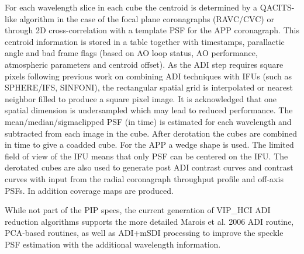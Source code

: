 For each wavelength slice in each cube the centroid is determined by a QACITS-like algorithm in the case of the focal plane coronagraphs (RAVC/CVC) or through 2D cross-correlation with a template PSF for the APP coronagraph. This centroid information is stored in a table together with timestamps, parallactic angle and bad frame flags (based on AO loop status, AO performance, atmospheric parameters and centroid offset).
As the ADI step requires square pixels following previous work on combining ADI techniques with IFUs (such as SPHERE/IFS, SINFONI), the rectangular spatial grid is interpolated or nearest neighbor filled to produce a square pixel image.
It is acknowledged that one spatial dimension is undersampled which may lead to reduced performance.
The mean/median/sigmaclipped PSF (in time) is estimated for each wavelength and subtracted from each image in the cube.
After derotation the cubes are combined in time to give a coadded cube. For the APP a wedge shape is used. The limited field of view of the IFU means that only PSF can be centered on the IFU. The derotated cubes are also used to generate post ADI contrast curves and contrast curves with input from the radial coronagraph throughput profile and off-axis PSFs. In addition coverage maps are produced.

While not part of the PIP specs, the current generation of VIP\_HCI ADI reduction algorithms supports
the more detailed Marois et al. 2006 ADI routine, PCA-based routines, as well as ADI+mSDI processing to improve the speckle PSF estimation with the additional wavelength information.



